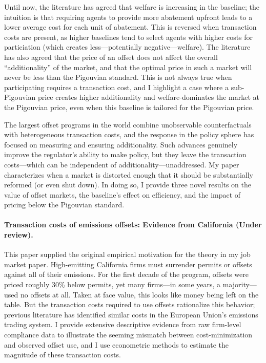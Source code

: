 \documentclass[12pt]{article}
\begin{document}
Until now, the literature has agreed that welfare is increasing in the baseline; the intuition is that requiring agents to provide more abatement upfront leads to a lower average cost for each unit of abatement. This is reversed when transaction costs are present, as higher baselines tend to select agents with higher costs for particiation (which creates less---potentially negative---welfare). The literature has also agreed that the price of an offset does not affect the overall ``additionality'' of the market, and that the optimal price in such a market will never be less than the Pigouvian standard. This is not always true when participating requires a transaction cost, and I highlight a case where a sub-Pigouvian price creates higher additionality and welfare-dominates the market at the Pigouvian price, even when this baseline is tailored for the Pigouvian price.

The largest offset programs in the world combine unobservable counterfactuals with heterogeneous transaction costs, and the response in the policy sphere has focused on measuring and ensuring additionality. Such advances genuinely improve the regulator's ability to make policy, but they leave the transaction costs---which can be independent of additionality---unaddressed. My paper characterizes when a market is distorted enough that it should be substantially reformed (or even shut down). In doing so, I provide three novel results on the value of offset markets, the baseline's effect on efficiency, and the impact of pricing below the Pigouvian standard.

\paragraph{Transaction costs of emissions offsets: Evidence from California (Under review).}

This paper supplied the original empirical motivation for the theory in my job market paper. High-emitting California firms must surrender permits or offsets against all of their emissions. For the first decade of the program, offsets were priced roughly 30\% below permits, yet many firms---in some years, a majority---used no offsets at all. Taken at face value, this looks like money being left on the table. But the transaction costs required to use offsets rationalize this behavior; previous literature has identified similar costs in the European Union's emissions trading system. I provide extensive descriptive evidence from raw firm-level compliance data to illustrate the seeming mismatch between cost-minimization and observed offset use, and I use econometric methods to estimate the magnitude of these transaction costs.
\end{document}
